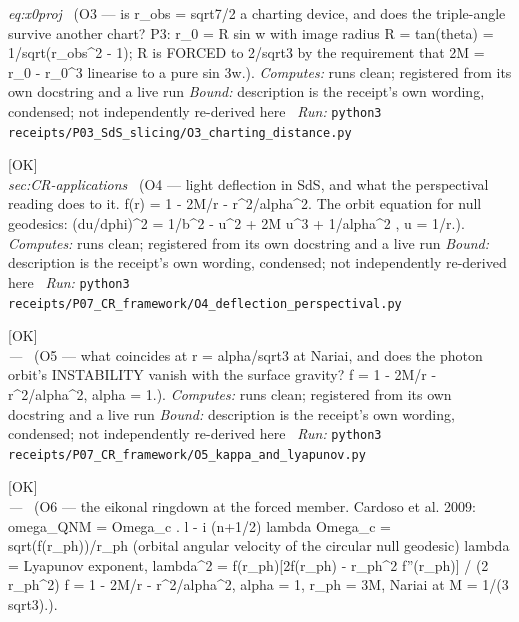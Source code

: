 \begin{description}
\textit{eq:x0proj} \ (O3 --- is r\_obs = sqrt7/2 a charting device, and does the triple-angle survive another chart? P3: r\_0 = R sin w with image radius R = tan(theta) = 1/sqrt(r\_obs\textasciicircum{}2 - 1); R is FORCED to 2/sqrt3 by the requirement that 2M = r\_0 - r\_0\textasciicircum{}3 linearise to a pure sin 3w.). 
\emph{Computes:} runs clean; registered from its own docstring and a live run
 \emph{Bound:} description is the receipt's own wording, condensed; not independently re-derived here
\ \emph{Run:} \texttt{python3 receipts/P03\_SdS\_slicing/O3\_charting\_distance.py}
\item[\label{rcpt:O4_deflection_perspectival}\texttt{O4\_deflection\_perspectival}]\hfill\textsf{[OK]}\\
\textit{sec:CR-applications} \ (O4 --- light deflection in SdS, and what the perspectival reading does to it. f(r) = 1 - 2M/r - r\textasciicircum{}2/alpha\textasciicircum{}2. The orbit equation for null geodesics: (du/dphi)\textasciicircum{}2 = 1/b\textasciicircum{}2 - u\textasciicircum{}2 + 2M u\textasciicircum{}3 + 1/alpha\textasciicircum{}2 , u = 1/r.). 
\emph{Computes:} runs clean; registered from its own docstring and a live run
 \emph{Bound:} description is the receipt's own wording, condensed; not independently re-derived here
\ \emph{Run:} \texttt{python3 receipts/P07\_CR\_framework/O4\_deflection\_perspectival.py}
\item[\label{rcpt:O5_kappa_and_lyapunov}\texttt{O5\_kappa\_and\_lyapunov}]\hfill\textsf{[OK]}\\
\textit{---} \ (O5 --- what coincides at r = alpha/sqrt3 at Nariai, and does the photon orbit's INSTABILITY vanish with the surface gravity? f = 1 - 2M/r - r\textasciicircum{}2/alpha\textasciicircum{}2, alpha = 1.). 
\emph{Computes:} runs clean; registered from its own docstring and a live run
 \emph{Bound:} description is the receipt's own wording, condensed; not independently re-derived here
\ \emph{Run:} \texttt{python3 receipts/P07\_CR\_framework/O5\_kappa\_and\_lyapunov.py}
\item[\label{rcpt:O6_eikonal_ringdown}\texttt{O6\_eikonal\_ringdown}]\hfill\textsf{[OK]}\\
\textit{---} \ (O6 --- the eikonal ringdown at the forced member. Cardoso et al. 2009: omega\_QNM = Omega\_c . l - i (n+1/2) \textbar{}lambda\textbar{} Omega\_c = sqrt(f(r\_ph))/r\_ph (orbital angular velocity of the circular null geodesic) lambda = Lyapunov exponent, lambda\textasciicircum{}2 = f(r\_ph)[2f(r\_ph) - r\_ph\textasciicircum{}2 f''(r\_ph)] / (2 r\_ph\textasciicircum{}2) f = 1 - 2M/r - r\textasciicircum{}2/alpha\textasciicircum{}2, alpha = 1, r\_ph = 3M, Nariai at M = 1/(3 sqrt3).). 

\end{description}
